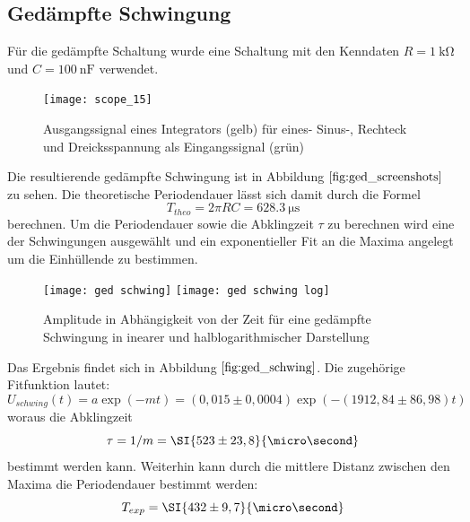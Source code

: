 \subsection{Gedämpfte Schwingung}
Für die gedämpfte Schaltung wurde eine Schaltung mit den Kenndaten $R=\SI{1}{\kilo\ohm}$ und $C=\SI{100}{\nano\farad}$ verwendet.
\begin{figure}
\centering
\texttt{[image: scope\_15]}
\caption{Ausgangssignal eines Integrators (gelb) für eines- Sinus-, Rechteck und Dreicksspannung als Eingangssignal (grün)}
\label{fig:ged_screenshots}
\end{figure}
Die resultierende gedämpfte Schwingung ist in Abbildung $\ref{fig:ged_screenshots}$ zu sehen. Die theoretische Periodendauer lässt sich damit durch die Formel
\begin{equation}
T_{theo}=2\pi RC=\SI{628,3}{\micro\second}
\end{equation}
berechnen. Um die Periodendauer sowie die Abklingzeit $\tau$ zu berechnen wird eine der Schwingungen ausgewählt und ein exponentieller Fit an die Maxima angelegt um die Einhüllende zu bestimmen.
\begin{figure}
\centering
\texttt{[image: ged schwing]}
\texttt{[image: ged schwing log]}
\caption{Amplitude in Abhängigkeit von der Zeit für eine gedämpfte Schwingung in inearer und halblogarithmischer Darstellung}
\label{fig:ged_schwing}
\end{figure}
Das Ergebnis findet sich in Abbildung $\ref{fig:ged_schwing}$. Die zugehörige Fitfunktion lautet:
\begin{equation}
U_{schwing}(t)=a\exp(-mt)=(0,015\pm0,0004)\exp(-(1912,84\pm86,98)t)
\end{equation}
woraus die Abklingzeit
\begin{equation}
\tau=1/m=\SI{523\pm23,8}{\micro\second}
\end{equation}
bestimmt werden kann. Weiterhin kann durch die mittlere Distanz zwischen den Maxima die Periodendauer bestimmt werden:
\begin{equation}
T_{exp}=\SI{432\pm9,7}{\micro\second}
\end{equation}
